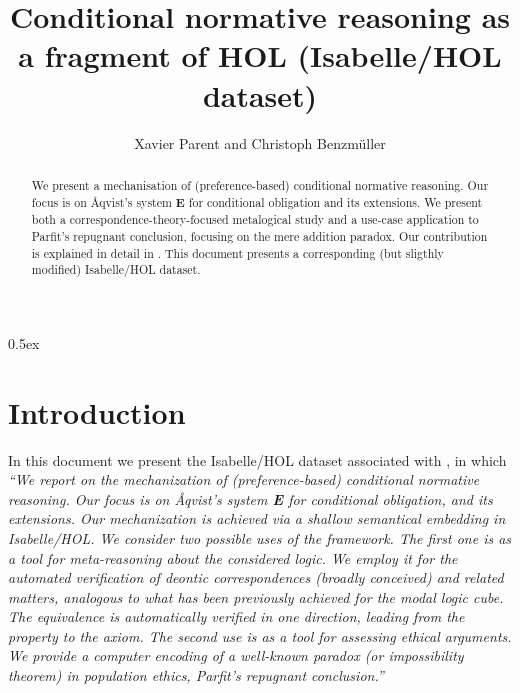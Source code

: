 \documentclass[11pt,a4paper]{article}
\begin{document}
\title{Conditional normative reasoning as a fragment of HOL
  (Isabelle/HOL dataset)}
\author{Xavier Parent and Christoph Benzm{\"u}ller}
\maketitle

\begin{abstract}
 We present a mechanisation of (preference-based) conditional
 normative reasoning. Our focus is on \AA qvist's system {\bf E} for
 conditional obligation and its extensions. We present both a
 correspondence-theory-focused metalogical study and a use-case
 application to Parfit's repugnant conclusion, focusing on the mere addition paradox.
Our contribution is explained in detail in \cite{J68}.  This document
presents a corresponding (but sligthly modified) Isabelle/HOL dataset.
\end{abstract}

\tableofcontents

\parindent 0pt\parskip 0.5ex


\section{Introduction}
In this document we present the Isabelle/HOL dataset associated with
\cite{J68}, in which 
\textit{``We report on the mechanization of (preference-based) conditional
normative reasoning. Our focus is on \AA qvist's system {\bf E} for
conditional obligation, and its extensions. Our mechanization is
achieved via a shallow semantical embedding in Isabelle/HOL.  We
consider two possible uses of the framework. The first one is as a
tool for meta-reasoning about the considered logic. We employ it for
the automated verification of deontic correspondences  (broadly
conceived) and related matters, analogous to what has been previously
achieved for the modal logic cube.  The equivalence is automatically
verified in one direction, leading from the property to the axiom. The
second use is as a tool for assessing ethical arguments. We provide a
computer encoding of a well-known paradox (or impossibility theorem)
in population ethics, Parfit's repugnant conclusion.''} \cite{J68}

\end{document}
